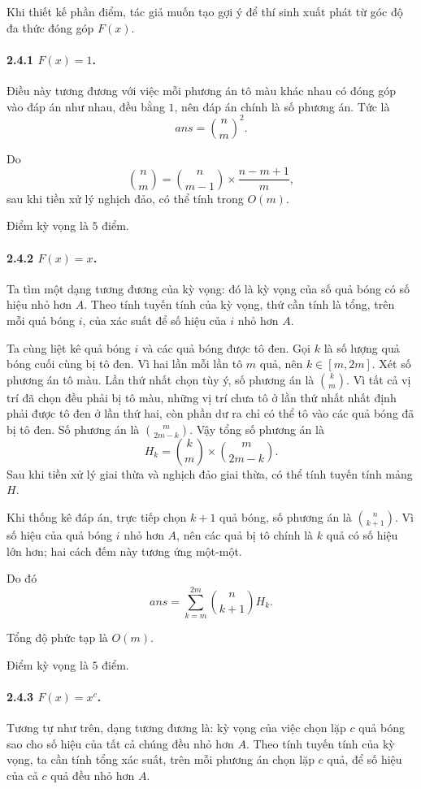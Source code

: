 \documentclass[11pt]{article}
\begin{document}
Khi thiết kế phần điểm, tác giả muốn tạo gợi ý để thí sinh xuất phát từ góc độ
đa thức đóng góp \(F(x)\).

\paragraph{2.4.1 \(F(x)=1\).}
Điều này tương đương với việc mỗi phương án tô màu khác nhau có đóng góp vào
đáp án như nhau, đều bằng \(1\), nên đáp án chính là số phương án. Tức là
\[
  ans=\binom{n}{m}^{2}.
\]

Do
\[
  \binom{n}{m}=\binom{n}{m-1}\times\frac{n-m+1}{m},
\]
sau khi tiền xử lý nghịch đảo, có thể tính trong \(O(m)\).

Điểm kỳ vọng là \(5\) điểm.

\paragraph{2.4.2 \(F(x)=x\).}
Ta tìm một dạng tương đương của kỳ vọng: đó là kỳ vọng của số quả bóng có số
hiệu nhỏ hơn \(A\). Theo tính tuyến tính của kỳ vọng, thứ cần tính là tổng, trên
mỗi quả bóng \(i\), của xác suất để số hiệu của \(i\) nhỏ hơn \(A\).

Ta cùng liệt kê quả bóng \(i\) và các quả bóng được tô đen. Gọi \(k\) là số
lượng quả bóng cuối cùng bị tô đen. Vì hai lần mỗi lần tô \(m\) quả, nên
\(k\in[m,2m]\). Xét số phương án tô màu. Lần thứ nhất chọn tùy ý, số phương án
là \(\binom{k}{m}\). Vì tất cả vị trí đã chọn đều phải bị tô màu, những vị trí
chưa tô ở lần thứ nhất nhất định phải được tô đen ở lần thứ hai, còn phần dư ra
chỉ có thể tô vào các quả bóng đã bị tô đen. Số phương án là
\(\binom{m}{2m-k}\). Vậy tổng số phương án là
\[
  H_k=\binom{k}{m}\times\binom{m}{2m-k}.
\]
Sau khi tiền xử lý giai thừa và nghịch đảo giai thừa, có thể tính tuyến tính
mảng \(H\).

Khi thống kê đáp án, trực tiếp chọn \(k+1\) quả bóng, số phương án là
\(\binom{n}{k+1}\). Vì số hiệu của quả bóng \(i\) nhỏ hơn \(A\), nên các quả bị
tô chính là \(k\) quả có số hiệu lớn hơn; hai cách đếm này tương ứng một-một.

Do đó
\[
  ans=\sum_{k=m}^{2m}\binom{n}{k+1}H_k.
\]

Tổng độ phức tạp là \(O(m)\).

Điểm kỳ vọng là \(5\) điểm.

\paragraph{2.4.3 \(F(x)=x^c\).}
Tương tự như trên, dạng tương đương là: kỳ vọng của việc chọn lặp \(c\) quả
bóng sao cho số hiệu của tất cả chúng đều nhỏ hơn \(A\). Theo tính tuyến tính
của kỳ vọng, ta cần tính tổng xác suất, trên mỗi phương án chọn lặp \(c\) quả,
để số hiệu của cả \(c\) quả đều nhỏ hơn \(A\).
\end{document}
